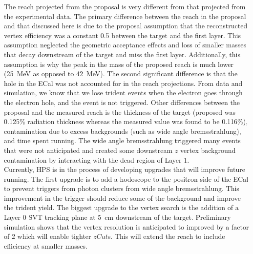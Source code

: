 The reach projected from the proposal is very different from that projected from the experimental data. The primary difference between the reach in the proposal and that discussed here is due to the proposal assumption that the reconstructed vertex efficiency was a constant 0.5 between the target and the first layer. This assumption neglected the geometric acceptance effects and loss of smaller masses that decay downstream of the target and miss the first layer. Additionally, this assumption is why the peak in the mass of the proposed reach is much lower (25~MeV as opposed to 42~MeV). The second significant difference is that the hole in the ECal was not accounted for in the reach projections. From data and simulation, we know that we lose trident events when the electron goes through the electron hole, and the event is not triggered. Other differences between the proposal and the measured reach is the thickness of the target (proposed was 0.125$\%$ radiation thickness whereas the measured value was found to be 0.116$\%$), contamination due to excess backgrounds (such as wide angle bremsstrahlung), and time spent running. The wide angle bremsstrahlung triggered many events that were not anticipated and created some downstream $z$ vertex background contamination by interacting with the dead region of Layer 1. \\
\indent Currently, HPS is in the process of developing upgrades that will improve future running. The first upgrade is to add a hodoscope to the positron side of the ECal to prevent triggers from photon clusters from wide angle bremsstrahlung. This improvement in the trigger should reduce some of the background and improve the trident yield. The biggest upgrade to the vertex search is the addition of a Layer 0 SVT tracking plane at 5~cm downstream of the target. Preliminary simulation shows that the vertex resolution is anticipated to improved by a factor of 2 which will enable tighter $zCut$s. This will extend the reach to include efficiency at smaller masses. 